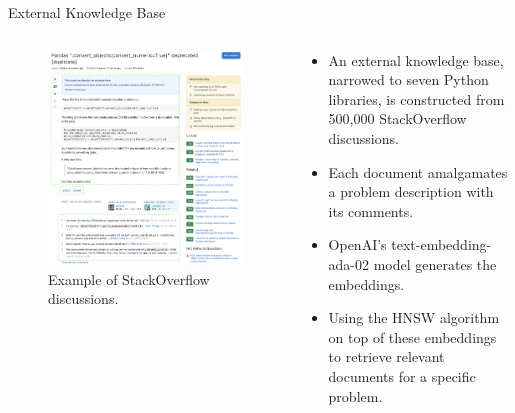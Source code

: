 \begin{frame}{External Knowledge Base}
    \begin{columns}[T] %
        \begin{column}{.4\textwidth}
            \begin{figure}[!htb]
                \centering
                \includegraphics[width=\textwidth]{img/stackoverflow.png}
                \captionsetup{font=small,labelformat=empty}
                \caption{Example of StackOverflow discussions.}
            \end{figure}
        \end{column}%
        \begin{column}{.6\textwidth}
            \begin{itemize}
                \item An external knowledge base, narrowed to seven Python libraries, is constructed from 500,000 StackOverflow discussions.
                \item Each document amalgamates a problem description with its comments.
                \item OpenAI's text-embedding-ada-02 model generates the embeddings.
                \item Using the HNSW algorithm on top of these embeddings to retrieve relevant documents for a specific problem.
            \end{itemize}
        \end{column}%
    \end{columns}
\end{frame}
